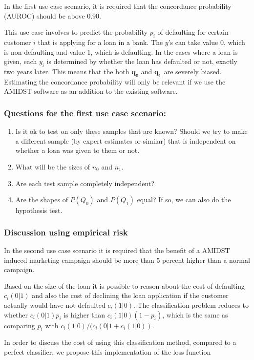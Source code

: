 \documentclass{article}
\theoremstyle{theorem}
\theoremstyle{definition}
\newcommand{\bv}[1]{\bm{#1}}
\begin{document}
In the first use case scenario, it is required that the concordance probability (AUROC) should be above 0.90.

This use case involves to predict the probability $p_i$ of defaulting for certain customer $i$ that is applying for a loan in a bank.  The $y$'s can take value 0, which is non defaulting and value 1, which is defaulting.  
In the cases where a loan is given, each $y_i$ is determined by whether the loan has defaulted or not, exactly two years later.  This means that the both $\bv{q_0}$ and $\bv{q_1}$ are severely biased.  Estimating the concordance probability will only be relevant if we use the AMIDST software as an addition to the existing software.

\subsubsection*{Questions for the first use case scenario: }
\begin{enumerate}
\item Is it ok to test on only these samples that are known?  Should we try to make a different sample (by expert estimates or similar) that is independent on whether a loan was given to them or not. 
\item What will be the sizes of $n_0$ and $n_1$.
\item Are each test sample completely independent?
\item Are the shapes of $P(Q_0)$ and $P(Q_1)$ equal? If so, we can also do the hypothesis test.
\end{enumerate}

\subsubsection*{Discussion using empirical risk}

In the second use case scenario it is required that the benefit of a AMIDST induced marketing campaign should be more than 5 percent higher than a normal campaign. 

Based on the size of the loan it is possible to reason about the cost of defaulting $c_i(0|1)$ and also the cost of declining the loan application if the customer actually would have not defaulted $c_i(1|0)$.  The classification problem reduces to whether $c_i(0|1)p_i$ is higher than $c_i(1|0)(1-p_i)$, which is the same as comparing $p_i$ with $c_i(1|0)/(c_i(0|1 + c_i(1|0))$. 

In order to discuss the cost of using this classification method, compared to a perfect classifier, we propose this implementation of the loss function
\end{document}
